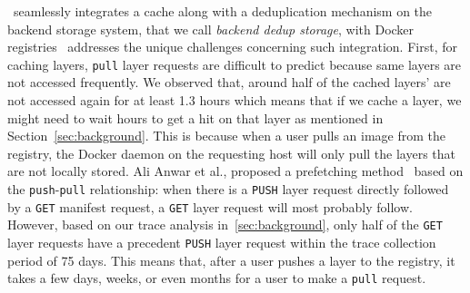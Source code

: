 \sysname~seamlessly integrates 
a cache along with a deduplication mechanism on the
backend storage system, that we call \emph{backend dedup storage}, with Docker registries
\sysname~addresses the unique challenges concerning such integration.
First, for caching layers, \texttt{pull} layer requests are difficult to
predict because same layers are not accessed frequently.
We observed that, around half of the cached layers' are not
accessed again for at least 1.3 hours which means that if we
cache a layer, we might need to wait hours to get a hit on that layer as mentioned in Section~\cref{sec:background}.  
This is
because when a user pulls an image from the registry, the Docker daemon on the
requesting host will only pull the layers that are not locally stored.
Ali Anwar et
al., proposed a prefetching method~\cite{dockerworkload} based on the
\texttt{push}-\texttt{pull} relationship: when there is a \texttt{PUSH} layer
request directly followed by a \texttt{GET} manifest request, a \texttt{GET}
layer request will most probably follow. 
However, based on our trace analysis in~\cref{sec:background},
only half of the \texttt{GET} layer
requests have a precedent \texttt{PUSH} layer request within the trace
collection period of 75 days. This means that, after a user pushes a layer
to the registry, it takes a few days, weeks, or even months for a user to make
a \texttt{pull} request.
